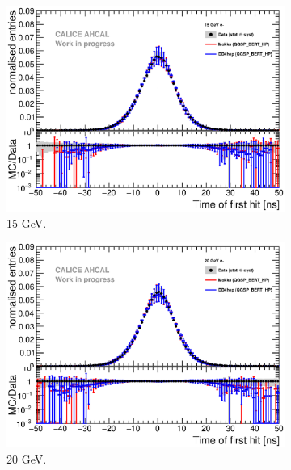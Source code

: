 \documentclass{JINST}
\begin{document}
\begin{figure}[htbp!]
  \begin{subfigure}[t]{0.49\textwidth}
    \centering
    \includegraphics[width=1\textwidth]{fig/Comparison_SimData_Electrons15GeV.eps}
    \caption{15 GeV.}\label{fig:elec_sim_data_15GeV}
  \end{subfigure}
  \hfill
  \begin{subfigure}[t]{0.49\textwidth}
    \centering
    \includegraphics[width=1\textwidth]{fig/Comparison_SimData_Electrons20GeV.eps}
    \caption{20 GeV.}\label{fig:elec_sim_data_20GeV}
  \end{subfigure}
  \hfill
  \begin{subfigure}[t]{0.49\textwidth}
    \centering

\end{subfigure}
\end{figure}
\end{document}
